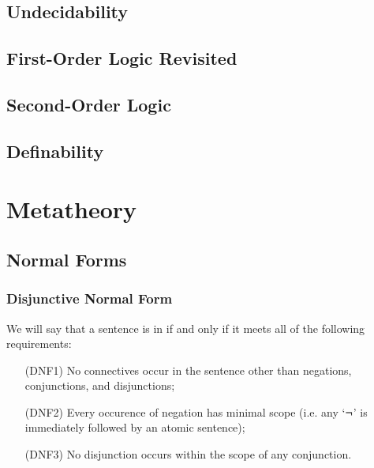 \documentclass[12pt, a4paper, oneside, openright, titlepage]{book}
\begin{document}
\chapter{\textsection\textsection Undecidability}


\chapter{\textsection\textsection First-Order Logic Revisited}



\chapter{\textsection\textsection Second-Order Logic}



\chapter{\textsection\textsection Definability}




\part{Metatheory}


\chapter{\textsection\textsection Normal Forms}

\section{\textsection Disjunctive Normal Form}

\begin{defn}
    We will say that a sentence is in  if and only if it meets all of the following requirements: \begin{itemize}[leftmargin=+1in]
        \item[(DNF1)] No connectives occur in the sentence other than negations, conjunctions, and disjunctions;
        \item[(DNF2)] Every occurence of negation has minimal scope (i.e. any `$\neg$' is immediately followed by an atomic sentence);
        \item[(DNF3)] No disjunction occurs within the scope of any conjunction.
    \end{itemize}
\end{defn}
\end{document}
